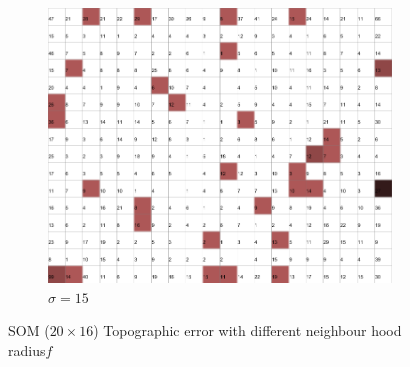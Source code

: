 \documentclass{acm_proc_article-sp}
\begin{document}
\begin{figure}
\begin{subfigure}[b]{0.30\linewidth}
        \includegraphics[width=\linewidth]{img/wine-newmid-topographic-error-sigma-15}
        \caption{$\sigma=15$}
    \end{subfigure}
    \caption{SOM ($20\times16$) Topographic error with different neighbour hood radius$f$}
    \label{fig:wine-newmid-topographic-error-sigma}
\end{figure}
\end{document}
